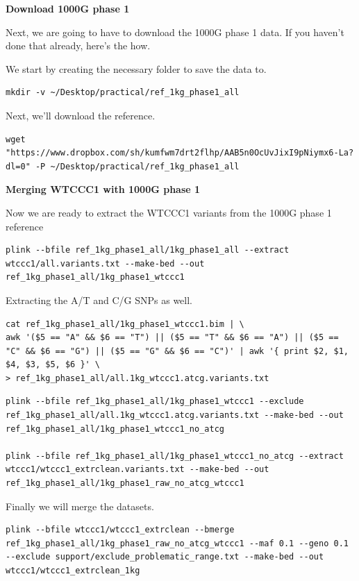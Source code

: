 \documentclass[
]{book}
\begin{document}
\textbf{Download 1000G phase 1}

Next, we are going to have to download the 1000G phase 1 data. If you haven't done that already, here's the how.

We start by creating the necessary folder to save the data to.

\begin{verbatim}
mkdir -v ~/Desktop/practical/ref_1kg_phase1_all
\end{verbatim}

Next, we'll download the reference.

\begin{verbatim}
wget "https://www.dropbox.com/sh/kumfwm7drt2flhp/AAB5n0OcUvJixI9pNiymx6-La?dl=0" -P ~/Desktop/practical/ref_1kg_phase1_all
\end{verbatim}

\textbf{Merging WTCCC1 with 1000G phase 1}

Now we are ready to extract the WTCCC1 variants from the 1000G phase 1 reference

\begin{verbatim}
plink --bfile ref_1kg_phase1_all/1kg_phase1_all --extract wtccc1/all.variants.txt --make-bed --out ref_1kg_phase1_all/1kg_phase1_wtccc1
\end{verbatim}

Extracting the A/T and C/G SNPs as well.

\begin{verbatim}
cat ref_1kg_phase1_all/1kg_phase1_wtccc1.bim | \
awk '($5 == "A" && $6 == "T") || ($5 == "T" && $6 == "A") || ($5 == "C" && $6 == "G") || ($5 == "G" && $6 == "C")' | awk '{ print $2, $1, $4, $3, $5, $6 }' \
> ref_1kg_phase1_all/all.1kg_wtccc1.atcg.variants.txt
\end{verbatim}

\begin{verbatim}
plink --bfile ref_1kg_phase1_all/1kg_phase1_wtccc1 --exclude ref_1kg_phase1_all/all.1kg_wtccc1.atcg.variants.txt --make-bed --out ref_1kg_phase1_all/1kg_phase1_wtccc1_no_atcg

plink --bfile ref_1kg_phase1_all/1kg_phase1_wtccc1_no_atcg --extract wtccc1/wtccc1_extrclean.variants.txt --make-bed --out ref_1kg_phase1_all/1kg_phase1_raw_no_atcg_wtccc1
\end{verbatim}

Finally we will merge the datasets.

\begin{verbatim}
plink --bfile wtccc1/wtccc1_extrclean --bmerge ref_1kg_phase1_all/1kg_phase1_raw_no_atcg_wtccc1 --maf 0.1 --geno 0.1 --exclude support/exclude_problematic_range.txt --make-bed --out wtccc1/wtccc1_extrclean_1kg
\end{verbatim}
\end{document}
